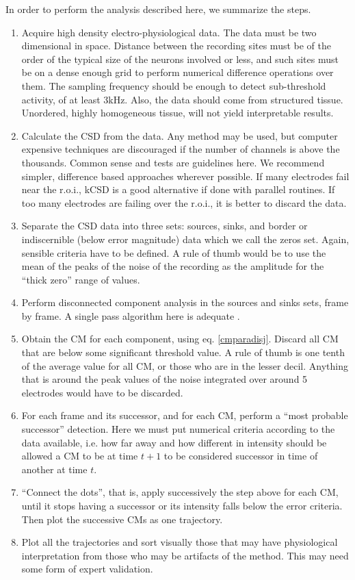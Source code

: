\documentclass[12pt, letterpaper]{article}
\begin{document}
 In order to perform the analysis described here, we summarize the steps.
 \begin{enumerate}
 \item Acquire high density electro-physiological data. The data must be two
   dimensional
   in space. Distance between the recording sites must be of the order of the typical
   size of the neurons involved or less, and such sites must be on a dense enough grid to perform numerical difference operations over them.
   The sampling frequency should be enough to detect sub-threshold activity,
   of at least 3kHz. Also, the data should come from structured tissue.
   Unordered, highly homogeneous tissue, will not yield interpretable results. 
 \item Calculate the CSD from the data. Any method may be used,
   but computer expensive techniques are discouraged if the
   number of channels is above the thousands.
   Common sense and tests are guidelines here.
   We recommend simpler, difference based approaches wherever possible.
   If many electrodes fail near the r.o.i.,
   kCSD is a good alternative if done with
   parallel routines.
   If too many electrodes are failing over the r.o.i.,
   it is better to discard the data. 
 \item Separate the CSD data into three sets: sources, sinks, and border or indiscernible (below error magnitude) data
   which we call the zeros set. Again, sensible criteria have to be defined.
   A rule of thumb would be to use the mean of the peaks of the noise  of the recording as the amplitude for the ``thick zero'' range of values. 
\item Perform disconnected component analysis in the sources and sinks sets, frame by frame.
  A single pass algorithm here is  adequate \cite{Vincent91, Abubaker07}.
\item  Obtain the CM for each component, using eq. \ref{cmparadisj}. Discard
  all CM that are below some significant threshold value. A rule of thumb is one tenth of the average value for all CM,
  or those who are in the lesser decil. Anything that is around the peak
  values of the noise integrated over around 5 electrodes would have to be discarded.
\item For each frame and its successor, and for each CM, perform a ``most probable successor'' detection. Here we must put numerical criteria according to the data available, i.e. how far away and how different in intensity should be allowed a CM to be at time $t+1$ to be considered successor in time of another at time $t$.
\item ``Connect the dots'', that is, apply successively the step above for each CM, until it stops having a successor or its intensity falls below the error criteria. Then plot the successive CMs as one trajectory.
\item Plot all the trajectories and sort visually those that may have physiological interpretation from those who may be artifacts of the method. This may need some form of expert validation.
 \end{enumerate}
 
\end{document}
